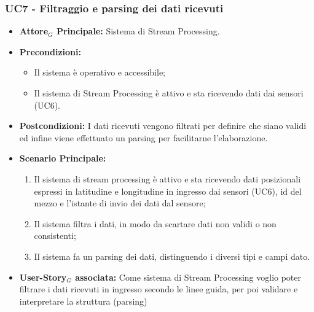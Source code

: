 \documentclass[11pt]{article}
\begin{document}
\begin{justify}
\begin{itemize}
\end{itemize}


\subsubsection{\textbf{UC7 - Filtraggio e parsing dei dati ricevuti}}
\label{UC7}
\begin{itemize}
    \item \textbf{Attore$_G$ Principale:} Sistema di Stream Processing.
    \item \textbf{Precondizioni:} 
        \begin{itemize}
          \item Il sistema è operativo e accessibile;
            \item Il sistema di Stream Processing è attivo e sta ricevendo dati dai sensori (UC6).
        \end{itemize}
      \item \textbf{Postcondizioni:} 
        I dati ricevuti vengono filtrati per definire che siano validi ed infine viene effettuato un parsing per facilitarne l'elaborazione.\\
    \item \textbf{Scenario Principale:} 
        \begin{enumerate}
        \item Il sistema di stream processing è attivo e sta ricevendo dati posizionali espressi in latitudine e longitudine in ingresso dai sensori (UC6), id del mezzo e l'istante di invio dei dati dal sensore;
        \item Il sistema filtra i dati, in modo da scartare dati non validi o non consistenti;
        \item Il sistema fa un parsing dei dati, distinguendo i diversi tipi e campi dato.
        \end{enumerate}
    \item \textbf{User-Story$_G$ associata:} Come sistema di Stream Processing voglio poter filtrare i dati ricevuti in ingresso secondo le linee guida, per poi validare e interpretare la struttura (parsing)
\end{itemize}



\end{justify}
\end{document}
